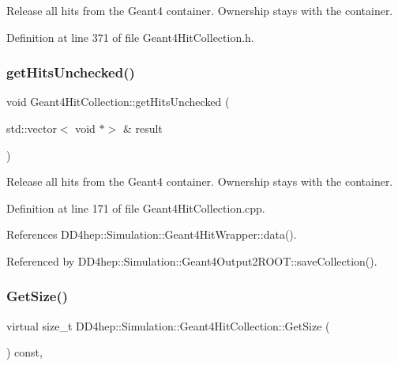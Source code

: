 Release all hits from the Geant4 container. Ownership stays with the container. 



Definition at line 371 of file Geant4\+Hit\+Collection.\+h.

\hypertarget{class_d_d4hep_1_1_simulation_1_1_geant4_hit_collection_afbf1de2a1cffd05688fe0573fc32220b}{}\label{class_d_d4hep_1_1_simulation_1_1_geant4_hit_collection_afbf1de2a1cffd05688fe0573fc32220b} 
\subsubsection{\texorpdfstring{get\+Hits\+Unchecked()}{getHitsUnchecked()}}
{\footnotesize\ttfamily void Geant4\+Hit\+Collection\+::get\+Hits\+Unchecked (\begin{DoxyParamCaption}\item[{std\+::vector$<$ void $\ast$$>$ \&}]{result }\end{DoxyParamCaption})}



Release all hits from the Geant4 container. Ownership stays with the container. 



Definition at line 171 of file Geant4\+Hit\+Collection.\+cpp.



References D\+D4hep\+::\+Simulation\+::\+Geant4\+Hit\+Wrapper\+::data().



Referenced by D\+D4hep\+::\+Simulation\+::\+Geant4\+Output2\+R\+O\+O\+T\+::save\+Collection().

\hypertarget{class_d_d4hep_1_1_simulation_1_1_geant4_hit_collection_adccefc2f8a73f693d2b87b146db87d44}{}\label{class_d_d4hep_1_1_simulation_1_1_geant4_hit_collection_adccefc2f8a73f693d2b87b146db87d44} 
\subsubsection{\texorpdfstring{Get\+Size()}{GetSize()}}
{\footnotesize\ttfamily virtual size\+\_\+t D\+D4hep\+::\+Simulation\+::\+Geant4\+Hit\+Collection\+::\+Get\+Size (\begin{DoxyParamCaption}{ }\end{DoxyParamCaption}) const\hspace{0.3cm}{\ttfamily [inline]}, {\ttfamily [virtual]}}



